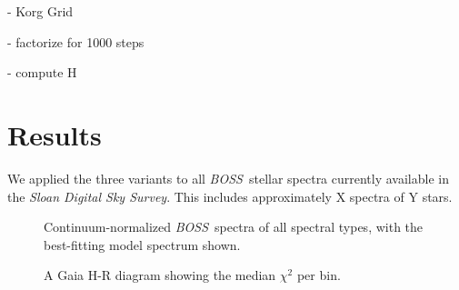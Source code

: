 \documentclass[modern]{aastex631}
\newcommand{\project}[1]{\textit{#1}}
\newcommand{\vectheta}{\boldsymbol{\theta}}
\newcommand{\vecpsi}{\boldsymbol{\psi}}
\newcommand{\boss}{\project{BOSS}}
\newcommand{\todo}[1]{\textcolor{tab:red}{#1}}
\begin{document}

- Korg Grid

- factorize for 1000 steps

- compute H



\section{Results}
\label{sec:results}

We applied the three variants to all \boss\ stellar spectra currently available in the \emph{Sloan Digital Sky Survey}. This includes approximately \todo{X} spectra of \todo{Y} stars. 


\begin{figure}
    \caption{Continuum-normalized \boss\ spectra of all spectral types, with the best-fitting model spectrum shown.}
\end{figure}



\begin{figure}
    \caption{A Gaia H-R diagram showing the median $\chi^2$ per bin.}
\end{figure}
\end{document}
